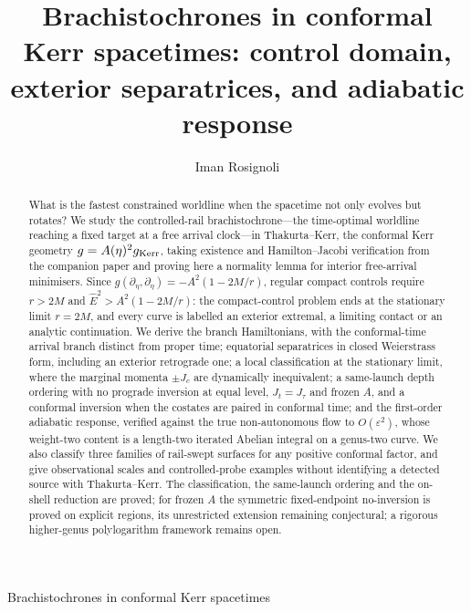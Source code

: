 \documentclass[12pt]{iopart}
\theoremstyle{plain}
\theoremstyle{definition}
\theoremstyle{remark}
\newcommand{\Ehat}{\hat E}
\begin{document}
\title{Brachistochrones in conformal Kerr spacetimes:
control domain, exterior separatrices, and adiabatic response}

\author{Iman Rosignoli}
\address{Department of Physics, University of Pavia, Via A.\ Bassi 6, 27100 Pavia, Italy}

\begin{abstract}
What is the fastest constrained worldline when the spacetime not only evolves but rotates?
We study the controlled-rail brachistochrone---the time-optimal worldline reaching a fixed
target at a free arrival clock---in Thakurta--Kerr, the conformal Kerr geometry
$g=A(\eta)^2 g_{\rm Kerr}$, taking existence and Hamilton--Jacobi verification from the
companion paper and proving here a normality lemma for interior free-arrival minimisers.
Since $g(\partial_\eta,\partial_\eta)=-A^2(1-2M/r)$, regular compact controls require
$r>2M$ and $\Ehat^2>A^2(1-2M/r)$: the compact-control problem ends at the stationary limit
$r=2M$, and every curve is labelled an exterior extremal, a limiting contact or an
analytic continuation. We derive the branch Hamiltonians, with the conformal-time arrival
branch distinct from proper time; equatorial separatrices in closed Weierstrass form,
including an exterior retrograde one; a local classification at the stationary limit,
where the marginal momenta $\pm J_c$ are dynamically inequivalent; a same-launch depth
ordering with no prograde inversion at equal level, $J_t=J_\tau$ and frozen $A$, and a
conformal inversion when the costates are paired in conformal time; and the first-order
adiabatic response, verified against the true non-autonomous flow to $O(\varepsilon^2)$,
whose weight-two content is a length-two iterated Abelian integral on a genus-two curve.
We also classify three families of rail-swept surfaces for any positive conformal factor,
and give observational scales and controlled-probe examples without identifying a detected
source with Thakurta--Kerr. The classification, the same-launch ordering and the on-shell
reduction are proved; for frozen $A$ the symmetric fixed-endpoint no-inversion is proved
on explicit regions, its unrestricted extension remaining conjectural; a rigorous
higher-genus polylogarithm framework remains open.
\end{abstract}

\maketitle
%
         {Brachistochrones in conformal Kerr spacetimes}
\end{document}
